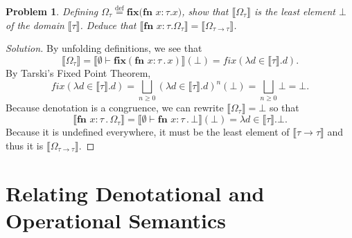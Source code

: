 \documentclass{article}
\newtheorem{problem}{Problem}[section]}
\newcommand{\f}{\rightarrow}
\newcommand{\den}[1]{\llbracket #1 \rrbracket}
\begin{document}
\begin{problem}
    Defining $\Omega_\tau\stackrel{\text{def}}{=}\textbf{fix(fn }x : \tau.x)$,
    show that $\den{\Omega_\tau}$ is the least element $\bot$ of the domain
    $\den{\tau}$. Deduce that $\den{\textbf{fn }x:\tau.\Omega_\tau} =
    \den{\Omega_{\tau\f\tau}}$.
\end{problem}
\begin{proof}[Solution]
    By unfolding definitions, we see that
    \[
        \den{\Omega_\tau} = \den{\emptyset\vdash \textbf{fix}(\textbf{fn
        }x:\tau\,.\,x)}(\bot) = \textit{fix}(\lambda d\in\den{\tau}.d).
    \]
    By Tarski's Fixed Point Theorem,
    \[
        \textit{fix}(\lambda d\in\den{\tau}.d) = \bigsqcup_{n\geq 0}(\lambda
        d\in\den{\tau}.d)^n(\bot) = \bigsqcup_{n\geq 0}\bot = \bot.
    \]
    Because denotation is a congruence, we can rewrite $\den{\Omega_\tau}=\bot$
    so that
    \[
        \den{\textbf{fn }x:\tau\,.\,\Omega_\tau} = \den{\emptyset\vdash \textbf{fn
        }x:\tau\,.\,\bot}(\bot) = \lambda d\in\den{\tau}.\bot.
    \]
    Because it is undefined everywhere, it must be the least element of
    $\den{\tau\f\tau}$ and thus it is $\den{\Omega_{\tau\f\tau}}$.
\end{proof}

\section{Relating Denotational and Operational Semantics}
\end{document}
